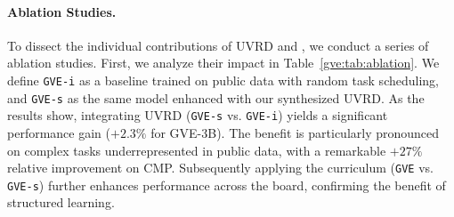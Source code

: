 \paragraph{Ablation Studies.}\label{gve:sec:ablation}
To dissect the individual contributions of UVRD and \pyramid, we conduct a series of ablation studies.
First, we analyze their impact in Table~\ref{gve:tab:ablation}.
We define \texttt{GVE-i} as a baseline trained on public data with random task scheduling, and \texttt{GVE-s} as the same model enhanced with our synthesized UVRD.
As the results show, integrating UVRD (\texttt{GVE-s} vs. \texttt{GVE-i}) yields a significant performance gain ($+2.3\%$ for GVE-3B). The benefit is particularly pronounced on complex tasks underrepresented in public data, with a remarkable $+27\%$ relative improvement on CMP. Subsequently applying the \pyramid curriculum (\texttt{GVE} vs. \texttt{GVE-s}) further enhances performance across the board, confirming the benefit of structured learning.

